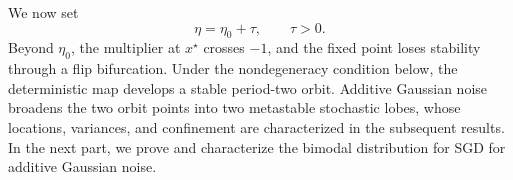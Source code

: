 \documentclass{article} %
\theoremstyle{plain}
\theoremstyle{definition}
\newcommand{\E}{\mathbb{E}}
\begin{document}
We now set
\begin{equation}
    \eta=\eta_0+\tau,
    \qquad \tau>0.
\end{equation}
Beyond $\eta_0$, the multiplier at $x^\star$ crosses $-1$, and the fixed point
loses stability through a flip bifurcation. Under the nondegeneracy condition
below, the deterministic map develops a stable period-two orbit. Additive
Gaussian noise broadens the two orbit points into two metastable stochastic
lobes, whose locations, variances, and confinement are characterized in the
subsequent results. In the next part, we prove and characterize the bimodal distribution for SGD for additive Gaussian noise. 

\end{document}
